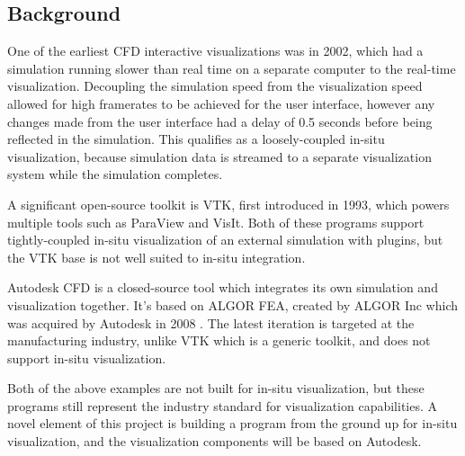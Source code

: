 \subsection{Background}




One of the earliest CFD interactive visualizations was in 2002, which had a simulation running slower than real time on a separate computer to the real-time visualization\cite{paper:2002vis:10.5555/509740.509745}.
Decoupling the simulation speed from the visualization speed allowed for high framerates to be achieved for the user interface, however any changes made from the user interface had a delay of 0.5 seconds before being reflected in the simulation.
This qualifies as a loosely-coupled in-situ visualization, because simulation data is streamed to a separate visualization system while the simulation completes.

A significant open-source toolkit is VTK\cite{VTKWebpage}, first introduced in 1993\cite{VTKBook}, which powers multiple tools such as ParaView\cite{ParaViewWebpage} and VisIt\cite{VisItWebpage}.
Both of these programs support tightly-coupled in-situ visualization of an external simulation with plugins, but the VTK base is not well suited to in-situ integration\cite{kress2017situ}.

Autodesk CFD\cite{AutodeskCFDWebpage} is a closed-source tool which integrates its own simulation and visualization together.
It's based on ALGOR FEA, created by ALGOR Inc which was acquired by Autodesk in 2008 \cite{AutodeskAcquiresALGOR}.
The latest iteration is targeted at the manufacturing industry, unlike VTK which is a generic toolkit, and does not support in-situ visualization.

Both of the above examples are not built for in-situ visualization, but these programs still represent the industry standard for visualization capabilities.
A novel element of this project is building a program from the ground up for in-situ visualization, and the visualization components will be based on Autodesk.